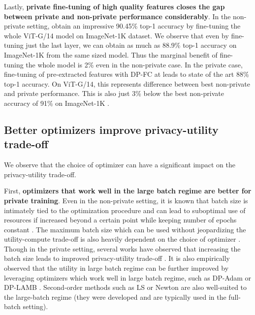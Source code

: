 \documentclass[letterpaper]{article} \usepackage{fullpage}
\begin{document}
Lastly, \textbf{private fine-tuning of high quality features closes the gap between private and non-private performance considerably}. In the non-private setting, \cite{zhai2021scaling} obtain an impressive 90.45\% top-1 accuracy by fine-tuning the whole ViT-G/14 model on ImageNet-1K dataset. We observe that even by fine-tuning just the last layer, we can obtain as much as 88.9\% top-1 accuracy on ImageNet-1K from the same sized model. Thus the marginal benefit of fine-tuning the whole model is 2\% even in the non-private case. In the private case, fine-tuning of pre-extracted features with DP-FC at  leads to state of the art 88\% top-1 accuracy. On ViT-G/14, this represents  difference between best non-private and private performance. This is also just 3\% below the best non-private accuracy of 91\% on ImageNet-1K \cite{yu2022coca}.



\subsection{Better optimizers improve privacy-utility trade-off}






We observe that the choice of optimizer can have a significant impact on the privacy-utility trade-off.

First, \textbf{optimizers that work well in the large batch regime are better for private training}. Even in the non-private setting, it is known that batch size is intimately tied to the optimization procedure and can lead to suboptimal use of resources if increased beyond a certain point while keeping number of epochs constant \cite{goyal2017largebatch,you2017largebatch,lamb}. The maximum batch size which can be used without jeopardizing the utility-compute trade-off is also heavily dependent on the choice of optimizer \cite{zhang2019algorithmic}. Though in the private setting, several works have observed that increasing the batch size leads to improved privacy-utility trade-off \cite{doorman_notallnoise_2021,li_large_batch,hoory_2021_llm}. It is also empirically observed that the utility in large batch regime can be further improved by leveraging optimizers which work well in large batch regime, such as DP-Adam or DP-LAMB \cite{anil21_dpbert,mehta2022large,bu2022scalable_oldsota}. Second-order methods such as LS or Newton are also well-suited to the large-batch regime (they were developed and are typically used in the full-batch setting).
\end{document}
